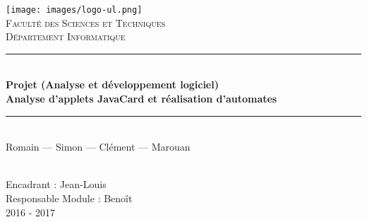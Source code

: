 \begin{titlepage}
\begin{center}

    \texttt{[image: images/logo-ul.png]} ~\\[1cm]
    \textsc{\LARGE Faculté des Sciences et Techniques} \\[0.5cm]
    \textsc{\Large Département Informatique} \\[1.5cm]

    \vspace*{3,5cm}

    \hrule height 0.05cm ~\\[0.4cm]
    {\huge \bfseries Projet (Analyse et développement logiciel)} \\[0.5cm]
    {\LARGE \bfseries Analyse d'applets JavaCard et réalisation d'automates} \\[0.5cm]
    \hrule height 0.05cm ~\\[0.6cm]

    {\large Romain  ---
	Simon  ---
	Clément  ---
	Marouan  }

    ~\\[2cm]


    \vfill
    Encadrant : 	 Jean-Louis \\
	Responsable Module :  Benoît\\
    {\large  2016 - 2017 \\}

\end{center}
\end{titlepage}